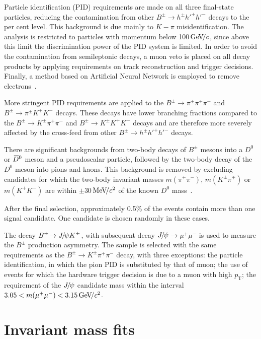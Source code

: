 \documentclass[12pt,a4paper]{article}
\def\Ppi         {\ensuremath{\uppi}\xspace}
\def\Ppsi        {\ensuremath{\uppsi}\xspace}
\def\PB      {\ensuremath{\mathrm{B}}\xspace}
\def\PD      {\ensuremath{\mathrm{D}}\xspace}
\def\PJ      {\ensuremath{\mathrm{J}}\xspace}
\def\PK      {\ensuremath{\mathrm{K}}\xspace}
\def\Ph      {\ensuremath{\mathrm{h}}\xspace}
\def\thebaroffset{0.0em}
\def\Ppi         {\ensuremath{\pi}\xspace}
\def\Ppsi        {\ensuremath{\psi}\xspace}
\def\PB      {\ensuremath{B}\xspace}
\def\PD      {\ensuremath{D}\xspace}
\def\PJ      {\ensuremath{J}\xspace}
\def\PK      {\ensuremath{K}\xspace}
\def\Ph      {\ensuremath{h}\xspace}
\def\thebaroffset{0.18em}
\newcommand{\offsetoverline}[2][\thebaroffset]{\kern #1\overline{\kern -#1 #2}}
\def\pion   {{\ensuremath{\Ppi}}\xspace}
\def\pip    {{\ensuremath{\pion^+}}\xspace}
\def\pim    {{\ensuremath{\pion^-}}\xspace}
\def\pipm   {{\ensuremath{\pion^\pm}}\xspace}
\def\kaon    {{\ensuremath{\PK}}\xspace}
\def\Kp      {{\ensuremath{\kaon^+}}\xspace}
\def\Km      {{\ensuremath{\kaon^-}}\xspace}
\def\Kpm     {{\ensuremath{\kaon^\pm}}\xspace}
\def\Dbar    {{\ensuremath{\offsetoverline{\PD}}}\xspace}
\def\D       {{\ensuremath{\PD}}\xspace}
\def\Dz      {{\ensuremath{\D^0}}\xspace}
\def\Dzb     {{\ensuremath{\Dbar{}^0}}\xspace}
\def\B       {{\ensuremath{\PB}}\xspace}
\def\Bpm     {{\ensuremath{\B^\pm}}\xspace}
\def\jpsi     {{\ensuremath{{\PJ\mskip -3mu/\mskip -2mu\Ppsi}}}\xspace}
\newcommand{\decay}[2]{\ensuremath{#1\!\to #2}\xspace}
\def\to                 {\ensuremath{\rightarrow}\xspace}
\def\Bhhh        {\decay{\Bpm}{\Ph^{\pm} \Ph'^+\Ph'^-}}
\def\Bjpsik      {\decay{\Bpm}{\jpsi\Kpm}}
\def\Bkpp        {\decay{\Bpm}{\Kpm \pip\pim}}
\newcommand{\aunit}[1]{\ensuremath{\text{\,#1}}}
\newcommand{\gevc}{\ensuremath{\aunit{Ge\kern -0.1em V\!/}c}\xspace}
\newcommand{\mevcc}{\ensuremath{\aunit{Me\kern -0.1em V\!/}c^2}\xspace}
\newcommand{\gevcc}{\ensuremath{\aunit{Ge\kern -0.1em V\!/}c^2}\xspace}
\def\pt         {\ensuremath{p_{\mathrm{T}}}\xspace}
\def\pipipi {\ensuremath{{\Bpm \to \pipm \pip \pim}}\xspace}
\def\kpipi {\ensuremath{{\Bpm \to \Kpm \pip \pim}}\xspace}
\def\kkpi {\ensuremath{{\Bpm \to \pipm \Kp \Km }}\xspace}
\def\kkk {\ensuremath{{\Bpm \to \Kpm \Kp \Km}}\xspace}
\begin{document}
Particle identification (PID) requirements are made on all three final-state particles, reducing the contamination from other \Bhhh decays to the per cent level. This background is due mainly to $K-\pi$  misidentification. 
The analysis is restricted to particles with momentum below 100\gevc, since above this limit the discrimination power of the PID system is limited. In order to avoid the contamination from semileptonic decays, a muon veto is placed on all decay products by applying requirements on track reconstruction and trigger decisions. Finally, a method based on Artificial Neural Network is employed to remove electrons~\cite{LHCb-DP-2018-001}. 

More stringent PID requirements are applied to the \mbox{\pipipi} and \mbox{\kkpi} decays. These decays have lower branching fractions compared to the \mbox{\kpipi} and \mbox{\kkk} decays and are therefore more severely affected by the cross-feed from other \Bhhh decays.

There are significant backgrounds from two-body decays of \Bpm mesons into a \Dz or \Dzb meson and a pseudoscalar particle, followed by the two-body decay of the \Dz meson into pions and kaons. This background is removed by excluding candidates for which the two-body invariant masses $m(\pi^+\pi^-)$, $m(K^{\pm}\pi^{\mp})$ or $m(K^+K^-)$ are within  $\pm30$\mevcc of the known \Dz mass~\cite{PDG2020}.

After the final selection, approximately 0.5\% of the events contain more than one signal candidate. One candidate is chosen randomly in these cases.

The decay \Bjpsik, with subsequent decay \jpsi$\to \mu^+\mu^-$ is used to measure the \Bpm production asymmetry. The sample is selected with the same requirements as the \Bkpp decay, with three exceptions: the particle identification, in which the pion PID is substituted by that of muon; the use of events for which the hardware trigger decision is due to a muon with high \pt; the requirement of the \jpsi candidate mass within the interval $3.05<m(\mu^+\mu^-)<3.15\gevcc$.



\section{Invariant mass fits}
\label{sec:massfits}
\end{document}

